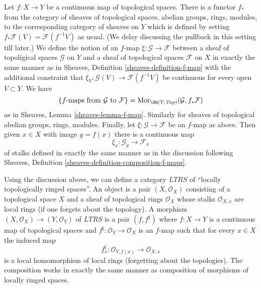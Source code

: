 \medskip\noindent
Let $f : X \to Y$ be a continuous map of topological spaces.
There is a functor $f_*$ from the category of sheaves of topological
spaces, abelian groups, rings, modules, to the corresponding category
of sheaves on $Y$ which is defined by setting
$f_*\mathcal{F}(V) = \mathcal{F}(f^{-1}V)$ as usual.
(We delay discussing the pullback in this setting till later.)
We define the notion of an $f$-map $\xi : \mathcal{G} \to \mathcal{F}$
between a sheaf of topoligical spaces $\mathcal{G}$ on $Y$ and
a sheaf of topological spaces $\mathcal{F}$ on $X$ in exactly the
same manner as in Sheaves, Definition \ref{sheaves-definition-f-map}
with the additional constraint that
$\xi_V : \mathcal{G}(V) \to \mathcal{F}(f^{-1}V)$ be continuous
for every open $V \subset Y$. We have
$$
\{f\text{-maps from }\mathcal{G}\text{ to }\mathcal{F}\} =
\text{Mor}_{\Sh(Y, \textit{Top})}(\mathcal{G}, f_*\mathcal{F})
$$
as in Sheaves, Lemma \ref{sheaves-lemma-f-map}. Similarly for
sheaves of topological abelian groups, rings, modules. Finally,
let $\xi : \mathcal{G} \to \mathcal{F}$ be an $f$-map as above.
Then given $x \in X$ with image $y = f(x)$ there is a continuous
map
$$
\xi_x : \mathcal{G}_y \longrightarrow \mathcal{F}_x
$$
of stalks defined in exactly the same manner as in the discussion
following Sheaves, Definition \ref{sheaves-definition-composition-f-maps}.

\medskip\noindent
Using the discussion above, we can define a category $LTRS$ of
``locally topologically ringed spaces''. An object is a pair
$(X, \mathcal{O}_X)$ consisting of a topological space
$X$ and a sheaf of topological rings $\mathcal{O}_X$ whose stalks
$\mathcal{O}_{X, x}$ are local rings (if one forgets about the topology).
A morphism $(X, \mathcal{O}_X) \to (Y, \mathcal{O}_Y)$ of
$LTRS$ is a pair $(f, f^\sharp)$ where $f : X \to Y$ is a continuous
map of topological spaces and $f^\sharp : \mathcal{O}_Y \to \mathcal{O}_X$
is an $f$-map such that for every $x \in X$ the induced map
$$
f^\sharp_x : \mathcal{O}_{Y, f(x)} \longrightarrow \mathcal{O}_{X, x}
$$
is a local homomorphism of local rings (forgetting about the topologies).
The composition works in exactly the same manner as composition of
morphisms of locally ringed spaces.

